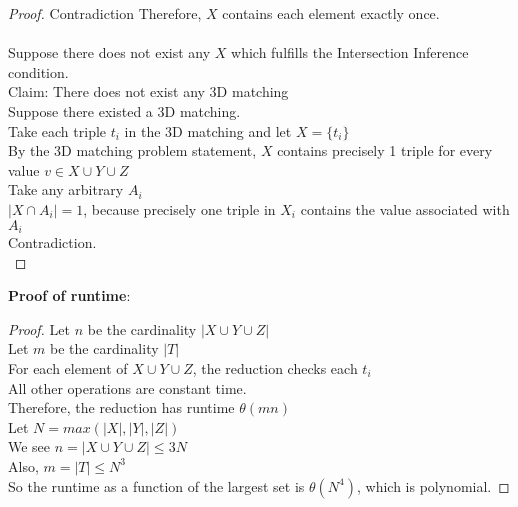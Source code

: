 \begin{problem}
\begin{proof}
        Contradiction
        Therefore, $X$ contains each element exactly once. \\\\
        Suppose there does not exist any $X$ which fulfills the Intersection Inference condition. \\
        Claim: There does not exist any 3D matching \\
        Suppose there existed a 3D matching. \\
        Take each triple $t_i$ in the 3D matching and let $X = \{t_i\}$ \\
        By the 3D matching problem statement, $X$ contains precisely 1 triple for every value $v \in X \cup Y \cup Z$ \\
        Take any arbitrary $A_i$ \\
        $|X \cap A_i| = 1$, because precisely one triple in $X_i$ contains the value associated with $A_i$ \\
        Contradiction. \\
    \end{proof}
    \noindent
    \textbf{Proof of runtime}:
    \begin{proof}
        Let $n$ be the cardinality $|X \cup Y \cup Z|$ \\
        Let $m$ be the cardinality $|T|$ \\
        For each element of $X \cup Y \cup Z$, the reduction checks each $t_i$ \\
        All other operations are constant time. \\
        Therefore, the reduction has runtime $\theta(mn)$ \\
        Let $N = max(|X|, |Y|, |Z|)$ \\
        We see $n = |X \cup Y \cup Z| \leq 3N$ \\
        Also, $m = |T| \leq N^3$ \\
        So the runtime as a function of the largest set is $\theta(N^4)$, which is polynomial.
    \end{proof}
\end{problem}
